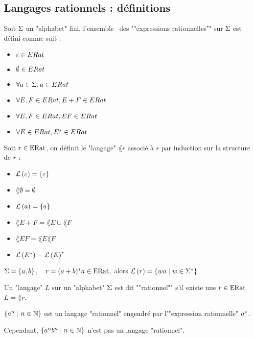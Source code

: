 \subsection{Langages rationnels : définitions}

\begin{definition}
	Soit $\Sigma$ un "alphabet" fini, l'ensemble \eratsym \ des ""expressions rationnelles"" sur $\Sigma$ est défini comme suit :
	\begin{itemize}
		\item $\varepsilon \in ERat$
		\item $\emptyset \in ERat$
		\item $\forall a \in \Sigma, a \in ERat$
		\item $\forall E, F \in ERat, E + F \in ERat$
		\item $\forall E, F \in ERat, EF \in ERat$
		\item $\forall E \in ERat, E^{*} \in ERat$
	\end{itemize}
\end{definition}

\begin{definition}
	Soit $r \in \text{ERat}$, on définit le "langage" $\lang r$ associé à $r$ par induction sur la structure de $r$ :
	\begin{itemize}
		\item $\mathcal{L}\left(\varepsilon\right) = \left\{\varepsilon\right\}$
		\item $\lang \emptyset = \emptyset$
		\item $\mathcal{L}\left(a\right) = \left\{a\right\}$
		\item $\lang {E + F} = \lang E \cup \lang F$
		\item $\lang {EF} = \lang E \lang F$
		\item $\mathcal{L}\left(E^{*}\right) = \mathcal{L}\left(E\right)^{*}$
	\end{itemize}
\end{definition}

\begin{exemple}
	$ \Sigma = \left\{a, b\right\}, \quad r = (a + b)^{*} a \in \text{ERat} $, alors
	$ \mathcal{L}\left(r\right) = \left\{wa \mid w \in \Sigma^{*}\right\} $
\end{exemple}


\begin{definition}
	Un "langage" $L$ sur un "alphabet" $\Sigma$ est dit ""rationnel"" s'il existe une \exprat $r \in \text{ERat}$ \tlq $L = \lang r$.

\end{definition}

\begin{exemple}
	$\left\{a^n \mid n \in \mathbb{N}\right\}$ est un langage "rationnel" engendré par l'"expression rationnelle" $a^{*}$.

	Cependant, $\left\{a^n b^n \mid n \in \mathbb{N}\right\}$ n'est pas un langage "rationnel".
\end{exemple}

